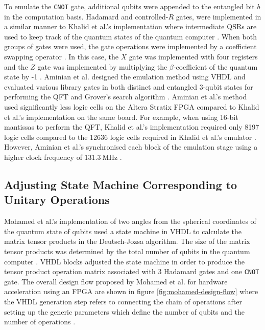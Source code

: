 To emulate the \texttt{CNOT} gate, additional qubits were appended to the entangled bit $b$ in the computation basis. Hadamard and controlled-$R$ gates, were implemented in a similar manner to Khalid et al.'s implementation where intermediate QSRs are used to keep track of the quantum states of the quantum computer \cite{Aminian2008, Khalid2004}. When both groups of gates were used, the gate operations were implemented by a coefficient swapping operator \cite{Aminian2008}. In this case, the $X$ gate was implemented with four registers and the $Z$ gate was implemented by multiplying the $\beta$-coefficient of the quantum state by -1 \cite{Aminian2008}. Aminian et al. designed the emulation method using VHDL and evaluated various library gates in both distinct and entangled 3-qubit states for performing the QFT and Grover's search algorithm \cite{Aminian2008}. Aminian et al.'s method used significantly less logic cells on the Altera Stratix FPGA compared to Khalid et al.'s implementation on the same board. For example, when using 16-bit mantissas to perform the QFT, Khalid et al.'s implementation required only 8197 logic cells compared to the 12636 logic cells required in Khalid et al.'s emulator \cite{Aminian2008, Khalid2004}. However, Aminian et al.'s synchronised each block of the emulation stage using a higher clock frequency of $\SI{131.3}{\mega\hertz}$ \cite{Aminian2008}. 

\subsection{Adjusting State Machine Corresponding to Unitary Operations}

Mohamed et al.'s implementation of two angles from the spherical coordinates of the quantum state of qubits used a state machine in VHDL to calculate the matrix tensor products in the Deutsch-Jozsa algorithm. The size of the matrix tensor products was determined by the total number of qubits in the quantum computer \cite{mohamed2009using}. VHDL blocks adjusted the state machine in order to produce the tensor product operation matrix associated with 3 Hadamard gates and one \texttt{CNOT} gate. The overall design flow proposed by Mohamed et al. for hardware acceleration using an FPGA are shown in figure \ref{fig:mohamed-design-flow} where the VHDL generation step refers to connecting the chain of operations after setting up the generic parameters which define the number of qubits and the number of operations \cite{mohamed2009using}. 

